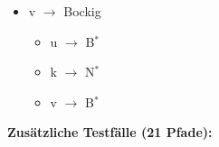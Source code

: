 \documentclass[
	fontsize=12pt,          %
	paper=a4,               %
	numbers=noenddot,       %
	listof=totoc,           %
	listof=entryprefix,     %
	listof=nochaptergap,    %
	bibliography=totoc,     %
	parskip=half,           %
	openany                 %
]{scrbook}
\begin{document}
\begin{itemize}
\begin{itemize}
\begin{itemize}
\begin{itemize}
\begin{itemize}
					\item u $\rightarrow$ B$^*$ \quad
					\item k $\rightarrow$ N$^*$ \quad
					\item v $\rightarrow$ B$^*$
				\end{itemize}
			\end{itemize}
		\end{itemize}
		\item v $\rightarrow$ Bockig
		\begin{itemize}
			\item u $\rightarrow$ B$^*$ \quad
			\item k $\rightarrow$ N$^*$ \quad
			\item v $\rightarrow$ B$^*$
		\end{itemize}
	\end{itemize}
\end{itemize}

\textbf{Zusätzliche Testfälle (21 Pfade):}
\end{document}
